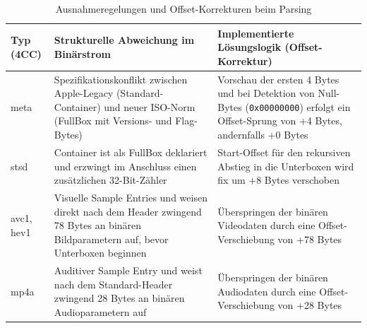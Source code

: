 \begin{table}[h]
    \centering
\caption{Ausnahmeregelungen und Offset-Korrekturen beim Parsing}
\label{tab:mp4ausnahmeboxen}
    \begin{tabular}{|l|p{4.5cm}|p{6.5cm}|}\hline
         \textbf{Typ (4CC)} & \textbf{Strukturelle Abweichung im Binärstrom} & \textbf{Implementierte Lösungslogik (Offset-Korrektur)} \\\hline
         meta & Spezifikationskonflikt zwischen Apple-Legacy (Standard-Container) und neuer ISO-Norm (FullBox mit Versions- und Flag-Bytes) & Vorschau der ersten 4 Bytes und bei Detektion von Null-Bytes (\texttt{0x00000000}) erfolgt ein Offset-Sprung von +4 Bytes, andernfalls +0 Bytes \\\hline
         stsd & Container ist als FullBox deklariert und erzwingt im Anschluss einen zusätzlichen 32-Bit-Zähler & Start-Offset für den rekursiven Abstieg in die Unterboxen wird fix um +8 Bytes verschoben \\\hline
         avc1, hev1 & Visuelle Sample Entries und weisen direkt nach dem Header zwingend 78 Bytes an binären Bildparametern auf, bevor Unterboxen beginnen & Überspringen der binären Videodaten durch eine Offset-Verschiebung von +78 Bytes\\\hline
         mp4a & Auditiver Sample Entry und weist nach dem Standard-Header zwingend 28 Bytes an binären Audioparametern auf & Überspringen der binären Audiodaten durch eine Offset-Verschiebung von +28 Bytes\\\hline
    \end{tabular}
\end{table}